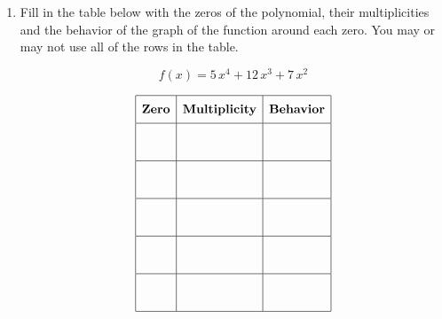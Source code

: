 \documentclass[11pt]{article}
\begin{document}
\begin{enumerate}
{{}
}

\newpage

% 

\item %
\providecommand{\stxKnowl}{}\renewcommand{\stxKnowl}[1]{#1}
\providecommand{\stxOuttro}{}\renewcommand{\stxOuttro}[1]{#1}
\providecommand{\stxTitle}{}\renewcommand{\stxTitle}[1]{#1}
\renewcommand{\stxOuttro}[1]{}
\stxKnowl{
Fill in the table below with the zeros of the polynomial, their multiplicities and the behavior of the graph of the function around each zero. You may or may not use all of the rows in the table.

\[f(x) = 5 \, x^{4} + 12 \, x^{3} + 7 \, x^{2}\]

 \[\begin{array}{|c|c|c|} \hline \rule[-0.8em]{0pt}{2.2em} \textbf{Zero} & \textbf{Multiplicity} & \textbf{Behavior} \\ \hline \rule[-1.2em]{0pt}{3em} & & \\ \hline \rule[-1.2em]{0pt}{3em} & & \\ \hline \rule[-1.2em]{0pt}{3em} & & \\ \hline \rule[-1.2em]{0pt}{3em} & & \\ \hline \rule[-1.2em]{0pt}{3em} & & \\ \hline \end{array}\] 

\stxOuttro{
Solution

\[\begin{aligned} f(x) &= 5 \, x^{4} + 12 \, x^{3} + 7 \, x^{2} \\ &= x^2(5 \, x^{2} + 12 \, x + 7) \\ &= x^2(5x + 7)(x + 1) \end{aligned}\]

 \[\begin{array}{|c|c|c|} \hline \rule[-0.8em]{0pt}{2.2em} \textbf{Zero} & \textbf{Multiplicity} & \textbf{Behavior} \\ \hline \rule[-1.2em]{0pt}{3em} -\frac{7}{5} & 1 & \text{cross} \\ \hline \rule[-1.2em]{0pt}{3em} -1 & 1 & \text{cross} \\ \hline \rule[-1.2em]{0pt}{3em} 0 & 2 & \text{bounce} \\ \hline \rule[-1.2em]{0pt}{3em} & & \\ \hline \rule[-1.2em]{0pt}{3em} & & \\ \hline \end{array}\] 

}}
\end{enumerate}
\end{document}
